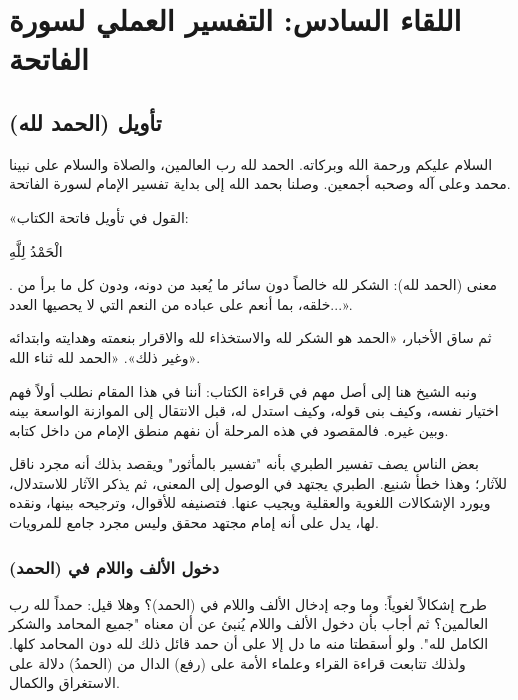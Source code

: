 \chapter{اللقاء السادس: التفسير العملي لسورة الفاتحة}

\section{تأويل (الحمد لله)}
السلام عليكم ورحمة الله وبركاته. الحمد لله رب العالمين، والصلاة والسلام على نبينا محمد وعلى آله وصحبه أجمعين. وصلنا بحمد الله إلى بداية تفسير الإمام  لسورة الفاتحة.

 «القول في تأويل فاتحة الكتاب: \begin{ayah}الْحَمْدُ لِلَّهِ\end{ayah}. معنى (الحمد لله): الشكر لله خالصاً دون سائر ما يُعبد من دونه، ودون كل ما برأ من خلقه، بما أنعم على عباده من النعم التي لا يحصيها العدد...».

ثم ساق  الأخبار،    «الحمد هو الشكر لله والاستخذاء لله والاقرار بنعمته وهدايته وابتدائه وغير ذلك».    «الحمد لله ثناء الله».

ونبه الشيخ هنا إلى أصل مهم في قراءة الكتاب: أننا في هذا المقام نطلب أولاً فهم اختيار  نفسه، وكيف بنى قوله، وكيف استدل له، قبل الانتقال إلى الموازنة الواسعة بينه وبين غيره. فالمقصود في هذه المرحلة أن نفهم منطق الإمام من داخل كتابه.

\begin{fawaid}
بعض الناس يصف تفسير الطبري بأنه "تفسير بالمأثور" ويقصد بذلك أنه مجرد ناقل للآثار؛ وهذا خطأ شنيع. الطبري يجتهد في الوصول إلى المعنى، ثم يذكر الآثار للاستدلال، ويورد الإشكالات اللغوية والعقلية ويجيب عنها. فتصنيفه للأقوال، وترجيحه بينها، ونقده لها، يدل على أنه إمام مجتهد محقق وليس مجرد جامع للمرويات.
\end{fawaid}

\subsection{دخول الألف واللام في (الحمد)}
طرح  إشكالاً لغوياً: وما وجه إدخال الألف واللام في (الحمد)؟ وهلا قيل: حمداً لله رب العالمين؟
ثم أجاب بأن دخول الألف واللام يُنبئ عن أن معناه "جميع المحامد والشكر الكامل لله". ولو أسقطتا منه ما دل إلا على أن حمد قائل ذلك لله دون المحامد كلها. 
ولذلك تتابعت قراءة القراء وعلماء الأمة على (رفع) الدال من (الحمدُ) دلالة على الاستغراق والكمال.

